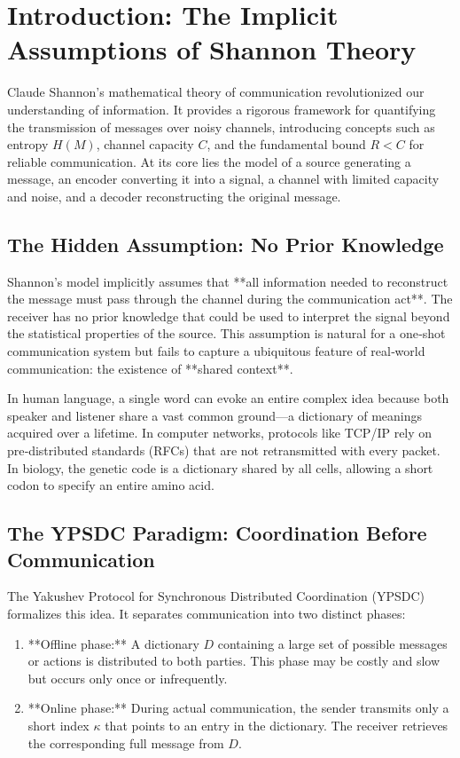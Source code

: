 \documentclass[12pt,a4paper]{article}
\theoremstyle{remark}
\begin{document}
	\section{Introduction: The Implicit Assumptions of Shannon Theory}
	\label{sec:intro}
	
	Claude Shannon's mathematical theory of communication \cite{Shannon1948} revolutionized our understanding of information. It provides a rigorous framework for quantifying the transmission of messages over noisy channels, introducing concepts such as entropy $H(M)$, channel capacity $C$, and the fundamental bound $R < C$ for reliable communication. At its core lies the model of a source generating a message, an encoder converting it into a signal, a channel with limited capacity and noise, and a decoder reconstructing the original message.
	
	\subsection{The Hidden Assumption: No Prior Knowledge}
	
	Shannon's model implicitly assumes that **all information needed to reconstruct the message must pass through the channel during the communication act**. The receiver has no prior knowledge that could be used to interpret the signal beyond the statistical properties of the source. This assumption is natural for a one‑shot communication system but fails to capture a ubiquitous feature of real‑world communication: the existence of **shared context**.
	
	In human language, a single word can evoke an entire complex idea because both speaker and listener share a vast common ground—a dictionary of meanings acquired over a lifetime. In computer networks, protocols like TCP/IP rely on pre‑distributed standards (RFCs) that are not retransmitted with every packet. In biology, the genetic code is a dictionary shared by all cells, allowing a short codon to specify an entire amino acid.
	
	\subsection{The YPSDC Paradigm: Coordination Before Communication}
	
	The Yakushev Protocol for Synchronous Distributed Coordination (YPSDC) \cite{Yakushev2026a, AppendixB} formalizes this idea. It separates communication into two distinct phases:
	\begin{enumerate}
		\item **Offline phase:** A dictionary $D$ containing a large set of possible messages or actions is distributed to both parties. This phase may be costly and slow but occurs only once or infrequently.
		\item **Online phase:** During actual communication, the sender transmits only a short index $\kappa$ that points to an entry in the dictionary. The receiver retrieves the corresponding full message from $D$.
	\end{enumerate}
	
\end{document}
